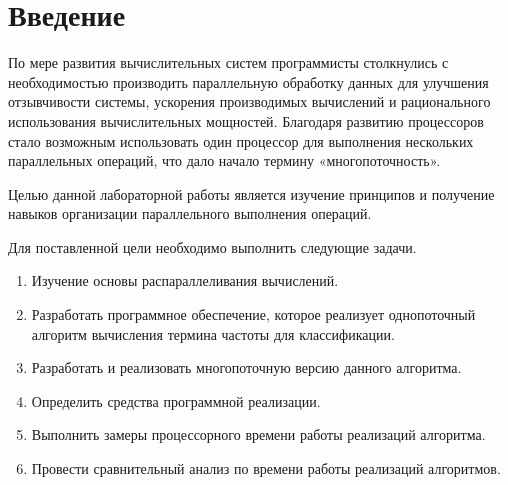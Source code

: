 \chapter*{Введение}

По мере развития вычислительных систем программисты столкнулись с
необходимостью производить параллельную обработку данных для улучшения отзывчивости системы, ускорения производимых вычислений и рационального использования вычислительных мощностей. Благодаря развитию
процессоров стало возможным использовать один процессор для выполнения нескольких параллельных операций, что дало начало термину «многопоточность».


Целью данной лабораторной работы является изучение принципов
и получение навыков организации параллельного выполнения операций.

Для поставленной цели необходимо выполнить следующие задачи.
\begin{enumerate}
	\item Изучение основы распараллеливания вычислений.
	\item Разработать программное обеспечение, которое реализует однопоточный алгоритм вычисления термина частоты для классификации.
	\item Разработать и реализовать многопоточную версию данного алгоритма.
	\item Определить средства программной реализации.
	\item Выполнить замеры процессорного времени работы реализаций алгоритма.
	\item Провести сравнительный анализ по времени работы реализаций алгоритмов.
\end{enumerate}